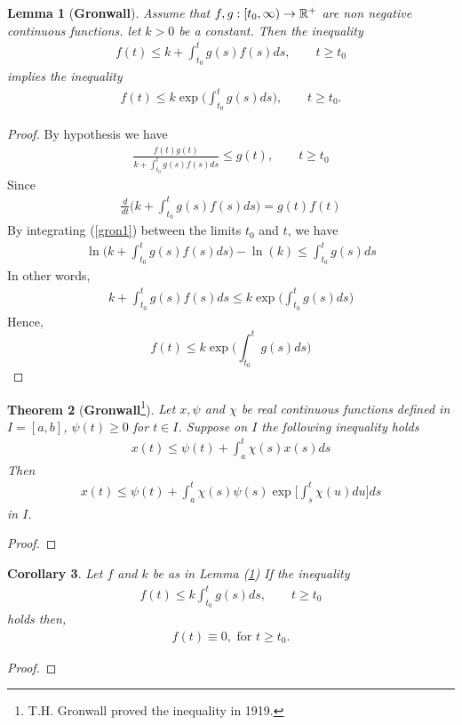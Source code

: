 \documentclass[leqno,DIV=calc,paper=a4,fontsize=11pt]{article}
\newtheorem{thm}{Theorem}[section]
\newtheorem{lem}[thm]{Lemma}
\newtheorem{cor}[thm]{Corollary}
\theoremstyle{definition}
\theoremstyle{plain}
\theoremstyle{remark}
\begin{document}
\begin{lem}[\textbf{Gronwall}]\label{thm1}
Assume that $f,g:[t_0,\infty)\rightarrow \Bbb R^{+}$ are non negative continuous functions. let $k>0$ be a constant. Then the inequality
\begin{align}
f(t)\leq k+\int_{t_0}^{t}g(s)f(s)ds,\qquad t\geq t_0
\end{align}
implies the inequality
\begin{align}
f(t)\leq k\exp\biggl(\int_{t_0}^{t}g(s)ds\biggl),\qquad t\geq t_0.
\end{align}
\end{lem}
\begin{proof}
By hypothesis we have
\begin{align}\label{gron1}
\frac{f(t)g(t)}{k+\int_{t_0}^{t}g(s)f(s)ds}\leq g(t), \qquad t\geq t_0
\end{align}
Since
\begin{align*}
\frac{d}{dt}\biggl(k+\int_{t_0}^{t}g(s)f(s)ds\biggl)=g(t)f(t)
\end{align*}
By integrating (\ref{gron1}) between the limits $t_0$ and $t$, we have
\begin{align*}
\ln\biggl(k+\int_{t_0}^{t}g(s)f(s)ds\biggl)-\ln(k)\leq\int_{t_0}^{t}g(s)ds
\end{align*}
In other words,
\begin{align*}
k+\int_{t_0}^{t}g(s)f(s)ds\leq k \exp\biggl(\int_{t_0}^{t}g(s)ds\biggl)
\end{align*}
Hence,
\[f(t)\leq k \exp\biggl(\int_{t_0}^{t}g(s)ds\biggl) \]
\end{proof}

\begin{thm}[\textbf{Gronwall}\footnote{T.H. Gronwall proved the inequality in 1919.}]
Let $x,\psi$ and $\chi$ be real continuous functions defined in $I=[a,b]$, $\psi(t)\geq0$ for $t\in I$. Suppose on $I$ the following inequality holds
\begin{align}
x(t)\leq \psi(t)+\int_{a}^{t}\chi(s)x(s)ds
\end{align}
Then
\begin{align}
x(t)\leq \psi(t)+\int_{a}^{t}\chi(s)\psi(s)\exp{\biggl[\int_{s}^{t}\chi(u)du\biggl]}ds
\end{align}
in $I$.
\end{thm}
\begin{proof}

\end{proof}


\begin{cor}
Let $f$ and $k$ be as in Lemma (\ref{thm1}) If the inequality
\begin{align}
f(t)\leq k\int_{t_0}^{t}g(s)ds,\qquad t\geq t_0
\end{align}
holds then,
\begin{align}
f(t)\equiv 0,\text{ for } t\geq t_0.
\end{align}
\end{cor}
\begin{proof}

\end{proof}
\end{document}
